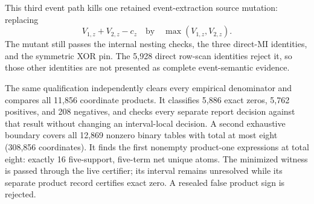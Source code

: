 \documentclass[11pt]{article}
\theoremstyle{definition}
\begin{document}
This third event path kills one retained event-extraction source mutation: replacing
\[
  V_{1,z}+V_{2,z}-c_z
  \quad\text{by}\quad
  \max(V_{1,z},V_{2,z}).
\]
The mutant still passes the internal nesting checks, the three direct-MI identities, and the
symmetric XOR pin.  The 5,928 direct row-scan identities reject it, so those other identities are
not presented as complete event-semantic evidence.

The same qualification independently clears every empirical denominator and compares all 11,856
coordinate products.  It classifies 5,886 exact zeros, 5,762 positives, and 208 negatives, and
checks every separate report decision against that result without changing an interval-local
decision.  A second exhaustive boundary covers all 12,869 nonzero binary tables with total at most
eight (308,856 coordinates).  It finds the first nonempty product-one expressions at total eight:
exactly 16 five-support, five-term net unique atoms.  The minimized witness is passed through the
live certifier; its interval remains unresolved while its separate product record certifies exact
zero.  A resealed false product sign is rejected.
\end{document}

